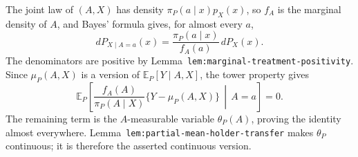 The joint law of \((A,X)\) has density \(\pi_P(a\mid x)p_X(x)\), so \(f_A\) is the marginal density of \(A\), and Bayes' formula gives, for almost every \(a\),
\[
dP_{X\mid A=a}(x)
=
\frac{\pi_P(a\mid x)}{f_A(a)}\,dP_X(x).
\]
The denominators are positive by Lemma~\texttt{lem:marginal-treatment-positivity}. Since \(\mu_P(A,X)\) is a version of \(\mathbb E_P[Y\mid A,X]\), the tower property gives
\[
\mathbb E_P\!\left[
\frac{f_A(A)}{\pi_P(A\mid X)}\{Y-\mu_P(A,X)\}
\,\middle|\,A=a\right]=0.
\]
The remaining term is the \(A\)-measurable variable \(\theta_P(A)\), proving the identity almost everywhere. Lemma~\texttt{lem:partial-mean-holder-transfer} makes \(\theta_P\) continuous; it is therefore the asserted continuous version.